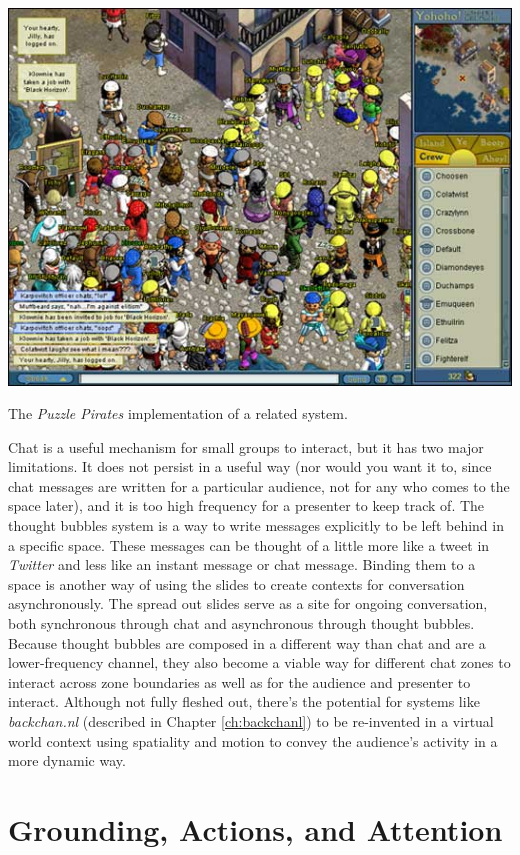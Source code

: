 \begin{marginfigure}
	\includegraphics{figures/pp_circles_chat.jpeg}
	\caption{The \emph{Puzzle Pirates} implementation of a related system.}
	\label{fig:pp_chat_circles}
\end{marginfigure}

Chat is a useful mechanism for small groups to interact, but it has two major limitations. It does not persist in a useful way (nor would you want it to, since chat messages are written for a particular audience, not for any who comes to the space later), and it is too high frequency for a presenter to keep track of. The thought bubbles system is a way to write messages explicitly to be left behind in a specific space. These messages can be thought of a little more like a tweet in \emph{Twitter} and less like an instant message or chat message. Binding them to a space is another way of using the slides to create contexts for conversation asynchronously. The spread out slides serve as a site for ongoing conversation, both synchronous through chat and asynchronous through thought bubbles. Because thought bubbles are composed in a different way than chat and are a lower-frequency channel, they also become a viable way for different chat zones to interact across zone boundaries as well as for the audience and presenter to interact. Although not fully fleshed out, there's the potential for systems like \emph{backchan.nl} (described in Chapter \ref{ch:backchanl}) to be re-invented in a virtual world context using spatiality and motion to convey the audience's activity in a more dynamic way.


\section{Grounding, Actions, and Attention}

